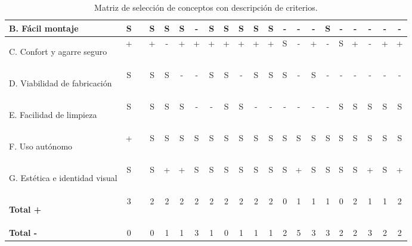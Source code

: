 \documentclass[11pt,a4paper]{article}
\begin{document}
\begin{landscape}
\begin{table}[H]
{\begin{tabular}{|>{\bfseries\huge\centering\arraybackslash}m{7cm}|c|c|c|c|c|c|c|c|c|c|c|c|c|c|c|c|c|c|c|c|}
        B. Fácil montaje & \huge S & & \huge S & \huge S & \huge S & \huge - & \huge S & \huge S & \huge S & \huge S & \huge S & \huge - & \huge - & \huge - & \huge S & \huge - & \huge - & \huge - & \huge - & \huge - \\ \cline{1-2} \cline{4-21}
        
        C. Confort y \newline agarre seguro & \huge + & & \huge + & \huge - & \huge + & \huge + & \huge + & \huge + & \huge + & \huge + & \huge + & \huge S & \huge - & \huge + & \huge - & \huge S & \huge + & \huge - & \huge + & \huge + \\ \cline{1-2} \cline{4-21}
        
        D. Viabilidad de fabricación & \huge S & & \huge S & \huge S & \huge - & \huge - & \huge S & \huge S & \huge - & \huge S & \huge S & \huge S & \huge - & \huge S & \huge - & \huge - & \huge - & \huge - & \huge - & \huge - \\ \cline{1-2} \cline{4-21}
        
        E. Facilidad de limpieza & \huge S & & \huge S & \huge S & \huge S & \huge - & \huge - & \huge S & \huge S & \huge - & \huge - & \huge - & \huge - & \huge - & \huge - & \huge S & \huge S & \huge S & \huge S & \huge S \\ \cline{1-2} \cline{4-21}
        
        F. Uso autónomo  & \huge + & & \huge S & \huge S & \huge S & \huge S & \huge S & \huge S & \huge S & \huge S & \huge S & \huge S & \huge S & \huge S & \huge S & \huge S & \huge S & \huge S & \huge S & \huge S \\ \cline{1-2} \cline{4-21}

        G. Estética e \newline identidad visual & \huge S & & \huge S & \huge + & \huge + & \huge S & \huge S & \huge S & \huge S & \huge S & \huge S & \huge S & \huge + & \huge S & \huge S & \huge S & \huge S & \huge + & \huge S & \huge + \\ \hline
        
        \rowcolor{gray!10}
        \textbf{\huge Total +} & \huge 3 & & \huge 2 & \huge 2 & \huge 2 & \huge 2 & \huge 2 & \huge 2 & \huge 2 & \huge 2 & \huge 2 & \huge 0 & \huge 1 & \huge 1 & \huge 1 & \huge 0 & \huge 2 & \huge 1 & \huge 1 & \huge 2 \\ \hline
        \rowcolor{gray!10}
        \textbf{\huge Total -} & \huge 0 & & \huge 0 & \huge 1 & \huge 1 & \huge 3 & \huge 1 & \huge 0 & \huge 1 & \huge 1 & \huge 1 & \huge 2 & \huge 5 & \huge 3 & \huge 3 & \huge 2 & \huge 2 & \huge 3 & \huge 2 & \huge 2 \\ \hline
    \end{tabular}
    }
    \vspace{0.4cm}
    \caption{Matriz de selección de conceptos con descripción de criterios.}
    \label{tab:matriz_pugh_grande}
\end{table}
\vspace*{\fill}
\end{landscape}
\end{document}
